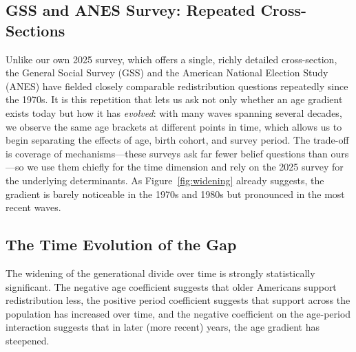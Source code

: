 \documentclass[11pt, headsepline]{article}
\begin{document}
\subsection{GSS and ANES Survey: Repeated Cross-Sections}

Unlike our own 2025 survey, which offers a single, richly detailed cross-section, the General Social Survey (GSS) and the American National Election Study (ANES) have fielded closely comparable redistribution questions repeatedly since the 1970s. It is this repetition that lets us ask not only whether an age gradient exists today but how it has \emph{evolved}: with many waves spanning several decades, we observe the same age brackets at different points in time, which allows us to begin separating the effects of age, birth cohort, and survey period. The trade-off is coverage of mechanisms---these surveys ask far fewer belief questions than ours---so we use them chiefly for the time dimension and rely on the 2025 survey for the underlying determinants. As Figure~\ref{fig:widening} already suggests, the gradient is barely noticeable in the 1970s and 1980s but pronounced in the most recent waves.

\subsection{The Time Evolution of the Gap}

The widening of the generational divide over time is strongly statistically significant. The negative age coefficient suggests that older Americans support redistribution less, the positive period coefficient suggests that support across the population has increased over time, and the negative coefficient on the age-period interaction suggests that in later (more recent) years, the age gradient has steepened.
\end{document}
